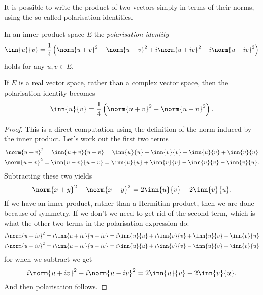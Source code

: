 \documentclass[12pt,oneside]{book}
\begin{document}
It is possible to write the product of two vectors simply in terms of their norms, using
the so-called polarisation identities.
\begin{theorem} \label{theo:polarisation}
	In an inner product space \( E \) the \emph{polarisation identity}
	\begin{equation*}
		\inn{u}{v} = \frac{1}{4}\left(\norm{u + v}^2 - \norm{u - v}^2 + i\norm{u + iv}^2 - i
		\norm{u - iv}^2\right)
	\end{equation*}
	holds for any \( u, v \in E \).

	If \( E \) is a real vector space, rather than a complex vector space, then the
	polarisation identity becomes
	\begin{equation*}
		\inn{u}{v} = \frac{1}{4}\left(\norm{u + v}^2 - \norm{u - v}^2\right).
	\end{equation*}
\end{theorem}
\begin{proof}
	This is a direct computation using the definition of the norm induced by the inner
	product. Let's work out the first two terms
	\begin{gather*}
		\norm{u+v}^2 = \inn{u+v}{u+v} = \inn{u}{u} + \inn{v}{v} + \inn{u}{v} + \inn{v}{u} \\
		\norm{u-v}^2 = \inn{u-v}{u-v} = \inn{u}{u} + \inn{v}{v} - \inn{u}{v} - \inn{v}{u}.
	\end{gather*}
	Subtracting these two yields
	\begin{equation*}
		\norm{x+y}^2 - \norm{x-y}^2 = 2\inn{u}{v}	+ 2\inn{v}{u}.
	\end{equation*}
	If we have an inner product, rather than a Hermitian product, then we are done because
	of symmetry. If we don't we need to get rid of the second term, which is what the other
	two terms in the polarisation expression do:
	\begin{gather*}
		i\norm{u+iv}^2 = i\inn{u+iv}{u+iv} = i\inn{u}{u} + i\inn{v}{v} + \inn{u}{v} - \inn{v}{u} \\
		i\norm{u-iv}^2 = i\inn{u-iv}{u-iv} = i\inn{u}{u} + i\inn{v}{v} - \inn{u}{v} +
		\inn{v}{u}
	\end{gather*}
	for when we subtract we get
	\begin{equation*}
		i\norm{u+iv}^2 - i\norm{u-iv}^2 = 2 \inn{u}{v} - 2 \inn{v}{u}.
	\end{equation*}
	And then polarisation follows.
\end{proof}
\end{document}
